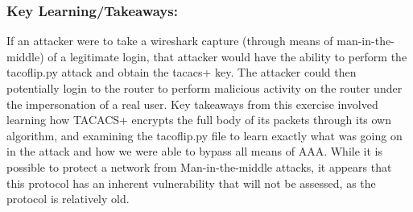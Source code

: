 \documentclass[main.tex]{subfiles}
\begin{document}
\subsubsection{Key Learning/Takeaways: }

If an attacker were to take a wireshark capture (through means of man-in-the-middle) of a legitimate login, that attacker would have the ability to perform the tacoflip.py attack and obtain the tacacs+ key. The attacker could then potentially login to the router to perform malicious activity on the router under the impersonation of a real user. Key takeaways from this exercise involved learning how TACACS+ encrypts the full body of its packets through its own algorithm, and examining the tacoflip.py file to learn exactly what was going on in the attack and how we were able to bypass all means of AAA. While it is possible to protect a network from Man-in-the-middle attacks, it appears that this protocol has an inherent vulnerability that will not be assessed, as the protocol is relatively old. 
\end{document}
